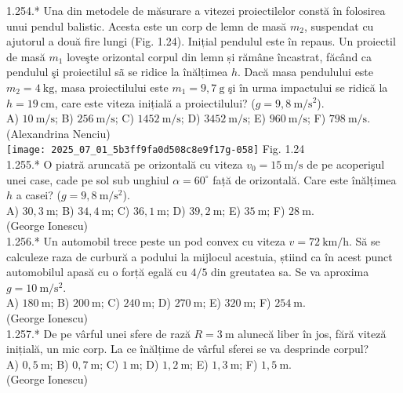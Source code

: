 {1.254.* Una din metodele de măsurare a vitezei proiectilelor constă în folosirea unui pendul balistic. Acesta este un corp de lemn de masă $m_{2}$, suspendat cu ajutorul a două fire lungi (Fig. 1.24). Inițial pendulul este în repaus. Un proiectil de masă $m_{1}$ loveşte orizontal corpul din lemn și rămâne încastrat, făcând ca pendulul şi proiectilul sã se ridice la înălțimea $h$. Dacă masa pendulului este $m_{2}=4 \mathrm{~kg}$, masa proiectilului este $m_{1}=9,7 \mathrm{~g}$ şi în urma impactului se ridică la $h=19 \mathrm{~cm}$, care este viteza inițială a proiectilului? ($g=9,8 \mathrm{~m} / \mathrm{s}^{2}$).\\ A) $10 \mathrm{~m} / \mathrm{s}$; B) $256 \mathrm{~m} / \mathrm{s}$; C) $1452 \mathrm{~m} / \mathrm{s}$; D) $3452 \mathrm{~m} / \mathrm{s}$; E) $960 \mathrm{~m} / \mathrm{s}$; F) $798 \mathrm{~m} / \mathrm{s}$.\\ (Alexandrina Nenciu)\\ \texttt{[image: 2025\_07\_01\_5b3ff9fa0d508c8e9f17g-058]} Fig. 1.24\\

1.255.* O piatră aruncată pe orizontală cu viteza $v_{0}=15 \mathrm{~m} / \mathrm{s}$ de pe acoperişul unei case, cade pe sol sub unghiul $\alpha=60^{\circ}$ față de orizontală. Care este înălțimea $h$ a casei? ($g=9,8 \mathrm{~m} / \mathrm{s}^{2}$).\\ A) $30,3 \mathrm{~m}$; B) $34,4 \mathrm{~m}$; C) $36,1 \mathrm{~m}$; D) $39,2 \mathrm{~m}$; E) $35 \mathrm{~m}$; F) $28 \mathrm{~m}$.\\ (George Ionescu)\\

1.256.* Un automobil trece peste un pod convex cu viteza $v=72 \mathrm{~km} / \mathrm{h}$. Să se calculeze raza de curbură a podului la mijlocul acestuia, știind ca în acest punct automobilul apasă cu o forță egală cu $4 / 5$ din greutatea sa. Se va aproxima $g=10 \mathrm{~m} / \mathrm{s}^{2}$.\\ A) $180 \mathrm{~m}$; B) $200 \mathrm{~m}$; C) $240 \mathrm{~m}$; D) $270 \mathrm{~m}$; E) $320 \mathrm{~m}$; F) $254 \mathrm{~m}$.\\ (George Ionescu)\\

1.257.* De pe vârful unei sfere de rază $R=3 \mathrm{~m}$ alunecă liber în jos, fără viteză inițială, un mic corp. La ce înălțime de vârful sferei se va desprinde corpul?\\ A) $0,5 \mathrm{~m}$; B) $0,7 \mathrm{~m}$; C) $1 \mathrm{~m}$; D) $1,2 \mathrm{~m}$; E) $1,3 \mathrm{~m}$; F) $1,5 \mathrm{~m}$.\\ (George Ionescu)\\

}
